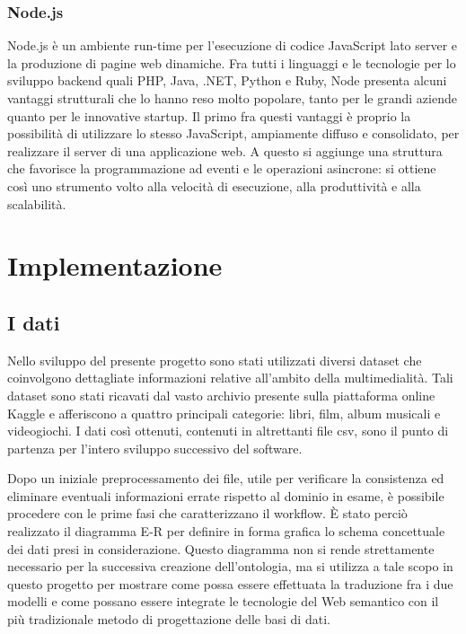 \documentclass[Lau,binding=0.6cm,noexaminfo,oneside]{sapthesis}
\begin{document}
\subsection{Node.js}

Node.js è un ambiente run-time per l'esecuzione di codice JavaScript lato server e la produzione di pagine web dinamiche. Fra tutti i linguaggi e le tecnologie per lo sviluppo backend quali PHP, Java, .NET, Python e Ruby, Node presenta alcuni vantaggi strutturali che lo hanno reso molto popolare, tanto per le grandi aziende quanto per le innovative startup. Il primo fra questi vantaggi è proprio la possibilità di utilizzare lo stesso JavaScript, ampiamente diffuso e consolidato, per realizzare il server di una applicazione web. A questo si aggiunge una struttura che favorisce la programmazione ad eventi e le operazioni asincrone: si ottiene così uno strumento volto alla velocità di esecuzione, alla produttività e alla scalabilità.\medskip



\chapter{Implementazione}
\section{I dati}

Nello sviluppo del presente progetto sono stati utilizzati diversi dataset che coinvolgono dettagliate informazioni relative all'ambito della multimedialità. Tali dataset sono stati ricavati dal vasto archivio presente sulla piattaforma online Kaggle e afferiscono a quattro principali categorie: libri, film, album musicali e videogiochi. I dati così ottenuti, contenuti in altrettanti file csv, sono il punto di partenza per l'intero sviluppo successivo del software.\medskip

Dopo un iniziale preprocessamento dei file, utile per verificare la consistenza ed eliminare eventuali informazioni errate rispetto al dominio in esame, è possibile procedere con le prime fasi che caratterizzano il workflow. \MakeUppercase{è} stato perciò realizzato il diagramma E-R per definire in forma grafica lo schema concettuale dei dati presi in considerazione. Questo diagramma non si rende strettamente necessario per la successiva creazione dell'ontologia, ma si utilizza a tale scopo in questo progetto per mostrare come possa essere effettuata la traduzione fra i due modelli e come possano essere integrate le tecnologie del Web semantico con il più tradizionale metodo di progettazione delle basi di dati.\medskip
\end{document}
